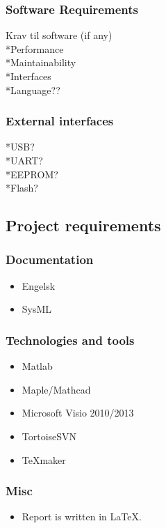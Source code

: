 \subsubsection{Software Requirements}
Krav til software (if any)\\
*Performance\\
*Maintainability\\
*Interfaces\\
*Language??\\

\subsubsection{External interfaces}
*USB?\\
*UART?\\
*EEPROM?\\
*Flash?\\

\subsection{Project requirements}

\subsubsection{Documentation}
\begin{itemize}
\item Engelsk
\item SysML
\end{itemize}

\subsubsection{Technologies and tools}
\begin{itemize}
\item Matlab
\item Maple/Mathcad
\item Microsoft Visio 2010/2013
\item TortoiseSVN
\item TeXmaker
\end{itemize}

\subsubsection{Misc}
\begin{itemize}
\item Report is written in LaTeX.
\end{itemize}

